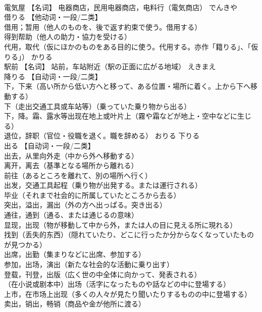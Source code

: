\documentclass[8pt]{extreport}
\begin{document}
\begin{CJK}{UTF8}{min}
\\	電気屋	【名词】 电器商店，民用电器商店，电料行（電気商店）	でんきや	
\\	借りる	【他动词・一段/二类】 
\\	借用；暂用（他人のものを、後で返す約束で使う。借用する） 
\\	得到帮助（他人の助力・協力を受ける） 
\\	代用，取代（仮にほかのものをある目的に使う。代用する。亦作「籍りる」、「仮りる」）	かりる	
\\	駅前	【名词】 站前，车站附近（駅の正面に広がる地域）	えきまえ	
\\	降りる	【自动词・一段/二类】 
\\	下，下来（高い所から低い方へと移って、ある位置・場所に着く。上から下へ移動する） 
\\	下（走出交通工具或车站等）（乗っていた乗り物から出る） 
\\	下，降。霜、露水等出现在地上或叶片上（霧や霜などが地上・空中などに生じる） 
\\	退位，辞职（官位・役職を退く。職を辞める）	おりる	下りる
\\	出る	【自动词・一段/二类】 
\\	出去，从里向外走（中から外へ移動する） 
\\	离开，离去（基準となる場所から離れる） 
\\	前往（あるところを離れて、別の場所へ行く） 
\\	出发，交通工具起程（乗り物が出発する。または運行される） 
\\	毕业（それまで社会的に所属していたところから去る） 
\\	突出，溢出，漏出（外の方へ出っぱる。突き出る） 
\\	通往，通到（通る、または通じるの意味） 
\\	显现，出现（物が移動して中から外，または人の目に見える所に現れる） 
\\	找到（丢失的东西）（隠れていたり、どこに行ったか分からなくなっていたものが見つかる） 
\\	出席，出勤（集まりなどに出席、参加する） 
\\	参加，出场，演出（新たな社会的な活動に乗り出す） 
\\	登载，刊登，出版（広く世の中全体に向かって、発表される） 
\\	（在小说或剧本中）出场（活字になったものや話などの中に登場する） 
\\	上市，在市场上出现（多くの人々が見たり聞いたりするものの中に登場する） 
\\	卖出，销出，畅销（商品や金が他所に渡る） 

\end{CJK}
\end{document}

